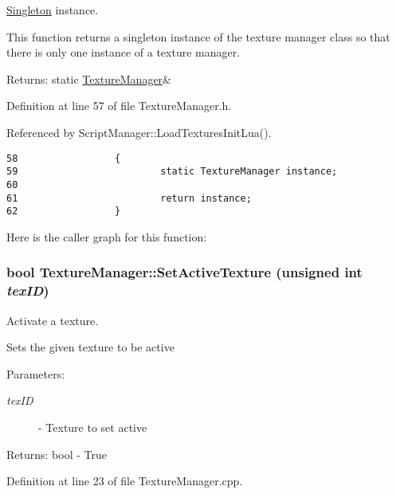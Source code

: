 \hyperlink{class_singleton}{Singleton} instance. 

This function returns a singleton instance of the texture manager class so that there is only one instance of a texture manager.

\begin{Desc}
\item[Returns:]static \hyperlink{class_texture_manager}{TextureManager}\& \end{Desc}


Definition at line 57 of file TextureManager.h.

Referenced by ScriptManager::LoadTexturesInitLua().

\begin{Code}\begin{verbatim}58                 {
59                         static TextureManager instance;
60 
61                         return instance;
62                 }
\end{verbatim}
\end{Code}




Here is the caller graph for this function:\hypertarget{class_texture_manager_48839479b7a9dd52b56960b584663c4c}{
\subsubsection[SetActiveTexture]{\setlength{\rightskip}{0pt plus 5cm}bool TextureManager::SetActiveTexture (unsigned int {\em texID})}}
\label{class_texture_manager_48839479b7a9dd52b56960b584663c4c}


Activate a texture. 

Sets the given texture to be active

\begin{Desc}
\item[Parameters:]
\begin{description}
\item[{\em texID}]- Texture to set active\end{description}
\end{Desc}
\begin{Desc}
\item[Returns:]bool - True \end{Desc}


Definition at line 23 of file TextureManager.cpp.

